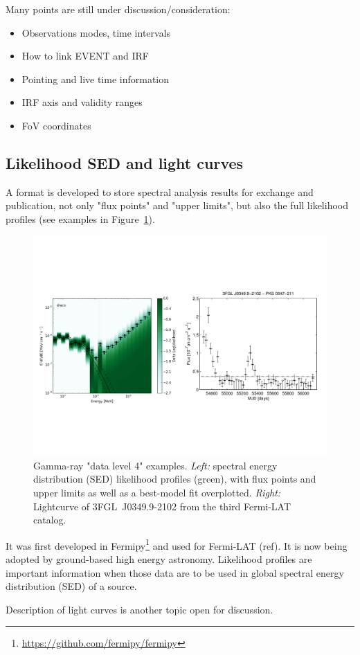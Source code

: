 Many points are still under discussion/consideration:

\begin{itemize}
\item{}Observations modes, time intervals
\item{}How to link EVENT and IRF
\item{}Pointing and live time information
\item{}IRF axis and validity ranges
\item{}FoV coordinates
\end{itemize}

\subsection{Likelihood SED and light curves}

A format is developed to store spectral analysis results for exchange and publication, not only "flux points" and "upper limits", but also the full likelihood profiles (see examples in Figure~\ref{fig:dl4-examples}).

\begin{figure}[tb]
\centerline{\includegraphics[width=\textwidth]{figures/dl4-examples}}
\caption{
Gamma-ray "data level 4" examples. \emph{Left:} spectral energy distribution (SED) likelihood profiles (green), with flux points and upper limits as well
as a best-model fit overplotted. \emph{Right:} Lightcurve of 3FGL~J0349.9-2102 from the third Fermi-LAT catalog.
}
\label{fig:dl4-examples}
\end{figure}

It was first developed in Fermipy\footnote{\url{https://github.com/fermipy/fermipy}} and used for Fermi-LAT (ref). It is now being adopted by ground-based high energy astronomy. Likelihood profiles are important information when those data are to be used in global spectral energy distribution (SED) of a source. 

Description of light curves is another topic open for discussion. 
